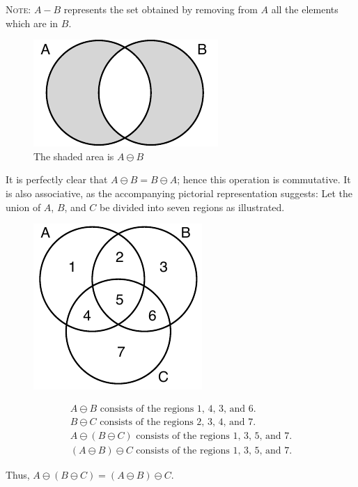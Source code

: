 \documentclass[twoside]{amsart}
\begin{document}
\begin{enumerate}[A.]
   \textsc{Note}: $A - B$ represents the set obtained by removing from
   $A$ all the elements which are in $B$.

   \begin{figure}[ht]
      \includegraphics{img/symdiff.pdf}
      \caption{The shaded area is $A \ominus B$}
      \label{fig:symmdif}
   \end{figure}

   It is perfectly clear that $A \ominus B = B \ominus A$; hence this 
   operation is commutative. It is also associative, as the accompanying
   pictorial representation suggests: Let the union of $A$, $B$, and
   $C$ be divided into seven regions as illustrated.

   \begin{figure}[ht]
      \includegraphics{img/symdiff3.pdf}
   \end{figure}

   \begin{gather*}
      A \ominus B \text{ consists of the regions 1, 4, 3, and 6.} \\
      B \ominus C \text{ consists of the regions 2, 3, 4, and 7.} \\
      A \ominus (B \ominus C) \text{ consists of the regions 1, 3, 5, and 7.}
      \\
      (A \ominus B) \ominus C \text{ consists of the regions 1, 3, 5, and 7.} 
   \end{gather*}

   \noindent Thus, $A \ominus (B \ominus C) = (A \ominus B) \ominus C$.



\end{enumerate}
\end{document}
